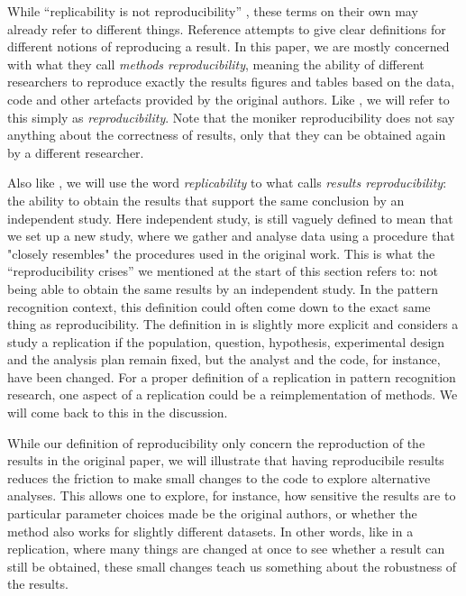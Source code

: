 \documentclass[runningheads,a4paper]{llncs}\usepackage[]{graphicx}\usepackage[]{color}
\begin{document}
While ``replicability is not reproducibility'' \cite{Drummond2009}, these terms on their own may already refer to different things. Reference \cite{Goodman2016a} attempts to give clear definitions for different notions of reproducing a result. In this paper, we are mostly concerned with what they call \emph{methods reproducibility}, meaning the ability of different researchers to reproduce exactly the results figures and tables based on the data, code and other artefacts provided by the original authors. Like \cite{Patil2016}, we will refer to this simply as \emph{reproducibility}. Note that the moniker reproducibility does not say anything about the correctness of results, only that they can be obtained again by a different researcher.

Also like \cite{Patil2016}, we will use the word \emph{replicability} to what \cite{Goodman2016a} calls \emph{results reproducibility}: the ability to obtain the results that support the same conclusion by an independent study. Here independent study, is still vaguely defined to mean that we set up a new study, where we gather and analyse data using a procedure that "closely resembles" the procedures used in the original work.  This is what the ``reproducibility crises'' we mentioned at the start of this section refers to: not being able to obtain the same results by an independent study. In the pattern recognition context, this definition could often come down to the exact same thing as reproducibility. The definition in \cite{Patil2016} is slightly more explicit and considers a study a replication if the population, question, hypothesis, experimental design and the analysis plan remain fixed, but the analyst and the code, for instance, have been changed. For a proper definition of a replication in pattern recognition research, one aspect of a replication could be a reimplementation of methods. We will come back to this in the discussion.

While our definition of reproducibility only concern the reproduction of the results in the original paper, we will illustrate that having reproducibile results reduces the friction to make small changes to the code to explore alternative analyses. This allows one to explore, for instance, how sensitive the results are to particular parameter choices made be the original authors, or whether the method also works for slightly different datasets. In other words, like in a replication, where many things are changed at once to see whether a result can still be obtained, these small changes teach us something about the robustness of the results.
\end{document}
